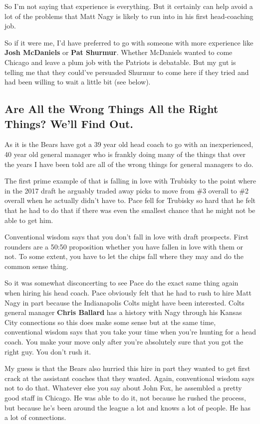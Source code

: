 \documentclass[11pt]{article}
\begin{document}
So I'm not saying that experience is everything.  But it certainly can
help avoid a lot of the problems that Matt Nagy is likely to run into
in his first head-coaching job.

So if it were me, I'd have preferred to go with someone with more
experience like \textbf{Josh McDaniels} or \textbf{Pat Shurmur}.
Whether McDaniels wanted to come Chicago and leave a
plum job with the Patriots is debatable.  But my gut is telling me that they
could've persuaded Shurmur to come here if they tried and had been willing to wait a little bit (see below).

\subsection{Are All the Wrong Things All the Right Things?  We'll Find Out.}

As it is the Bears have got a 39 year old head
coach to go with an inexperienced, 40 year old general manager who is frankly doing
many of the things that over the years I have been told are all of the wrong
things for general managers to do.

The first prime example of that is falling in love with Trubisky to
the point where in the 2017 draft he arguably traded away picks to
move from \#3 overall to \#2 overall when he actually didn't have
to.  Pace fell for Trubisky so hard that he felt that he had to do that if there was even the
smallest chance that he might not be able to get him.

Conventional wisdom says that you don't fall in love with draft
prospects.  First rounders are a 50:50 proposition whether you have
fallen in love with them or not. To some extent, you have
to let the chips fall where they may and do the common sense thing.

So it was somewhat disconcerting to see Pace do the exact same thing
again when hiring his head coach.  Pace obviously felt that he had to
rush to hire Matt Nagy in part because the Indianapolis Colts might
have been interested.  Colts general manager \textbf{Chris Ballard}
has a history with Nagy through his Kansas City connections so this
does make some sense but at the same time, conventional wisdom says
that you take your time when you're hunting for a head coach.  You
make your move only after you're absolutely sure that you got the
right guy.  You don't rush it.

My guess is that the Bears also hurried this hire in part they wanted to
get first crack at the assistant coaches that they wanted. Again,
conventional wisdom says not to do that.  Whatever else
you say about John Fox, he assembled a pretty good staff in Chicago.  He was
able to do it, not because he rushed the process, but because he's been
around the league a lot and knows a lot of people.  He has a lot of
connections.
\end{document}
